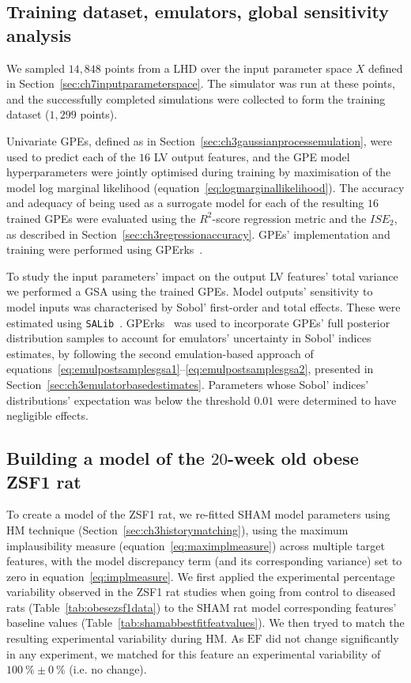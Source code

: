 %
%
%
\subsection{Training dataset, emulators, global sensitivity analysis}
We sampled $14,848$ points from a LHD over the input parameter space $X$ defined in Section~\ref{sec:ch7inputparameterspace}. The simulator was run at these points, and the successfully completed simulations were collected to form the training dataset ($1,299$ points).

\vspace{0.2cm}
Univariate GPEs, defined as in Section~\ref{sec:ch3gaussianprocessemulation}, were used to predict each of the $16$ LV output features, and the GPE model hyperparameters were jointly optimised during training by maximisation of the model log marginal likelihood (equation~\eqref{eq:logmarginallikelihood}). The accuracy and adequacy of being used as a surrogate model for each of the resulting $16$ trained GPEs were evaluated using the $R^2$-score regression metric and the $ISE_2$, as described in Section~\ref{sec:ch3regressionaccuracy}. GPEs' implementation and training were performed using GPErks~\cite{GPErks:2021}.

\vspace{0.2cm}
To study the input parameters' impact on the output LV features' total variance we performed a GSA using the trained GPEs. Model outputs' sensitivity to model inputs was characterised by Sobol' first-order and total effects. These were estimated using \texttt{SALib}~\cite{Herman:2017}. GPErks~\cite{GPErks:2021} was used to incorporate GPEs' full posterior distribution samples to account for emulators' uncertainty in Sobol' indices estimates, by following the second emulation-based approach of equations~\eqref{eq:emulpostsamplesgsa1}--\eqref{eq:emulpostsamplesgsa2}, presented in Section~\ref{sec:ch3emulatorbasedestimates}. Parameters whose Sobol' indices' distributions' expectation was below the threshold $0.01$ were determined to have negligible effects.


%
%
%
\subsection{Building a model of the $20$-week old obese ZSF1 rat}\label{sec:ch7buildingthezsf1ratmodelmethods}
To create a model of the ZSF1 rat, we re-fitted SHAM model parameters using HM technique (Section~\ref{sec:ch3historymatching}), using the maximum implausibility measure (equation~\eqref{eq:maximplmeasure}) across multiple target features, with the model discrepancy term (and its corresponding variance) set to zero in equation~\eqref{eq:implmeasure}. We first applied the experimental percentage variability observed in the ZSF1 rat studies when going from control to diseased rats (Table~\ref{tab:obesezsf1data}) to the SHAM rat model corresponding features' baseline values (Table~\ref{tab:shamabbestfitfeatvalues}). We then tryed to match the resulting experimental variability during HM. As $\textrm{EF}$ did not change significantly in any experiment, we matched for this feature an experimental variability of $\SI{100}{\percent}\pm\SI{0}{\percent}$ (i.e. no change).

